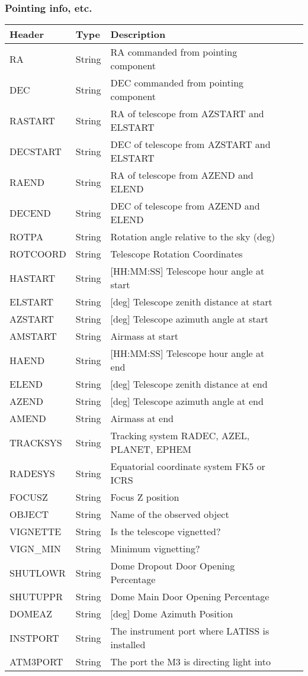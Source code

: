 \subsubsection{Pointing info, etc.}


\begin{tabular}{l l l l l}
\hline
Header & Type & Description \\
\hline
RA & String & RA commanded from pointing component \\
DEC & String & DEC commanded from pointing component \\
RASTART & String & RA of telescope from AZSTART and ELSTART \\
DECSTART & String & DEC of telescope from AZSTART and ELSTART \\
RAEND & String & RA of telescope from AZEND and ELEND \\
DECEND & String & DEC of telescope from AZEND and ELEND \\
ROTPA & String & Rotation angle relative to the sky (deg) \\
ROTCOORD & String & Telescope Rotation Coordinates \\
HASTART & String & [HH:MM:SS] Telescope hour angle at start \\
ELSTART & String & [deg] Telescope zenith distance at start \\
AZSTART & String & [deg] Telescope azimuth angle at start \\
AMSTART & String & Airmass at start \\
HAEND & String & [HH:MM:SS] Telescope hour angle at end \\
ELEND & String & [deg] Telescope zenith distance at end \\
AZEND & String & [deg] Telescope azimuth angle at end \\
AMEND & String & Airmass at end \\
TRACKSYS & String & Tracking system RADEC, AZEL, PLANET, EPHEM \\
RADESYS & String & Equatorial coordinate system FK5 or ICRS \\
FOCUSZ & String & Focus Z position \\
OBJECT & String & Name of the observed object \\
VIGNETTE & String & Is the telescope vignetted? \\
VIGN\_MIN & String & Minimum vignetting? \\
SHUTLOWR & String & Dome Dropout Door Opening Percentage \\
SHUTUPPR & String & Dome Main Door Opening Percentage \\
DOMEAZ & String & [deg] Dome Azimuth Position \\
INSTPORT & String & The instrument port where LATISS is installed \\
ATM3PORT & String & The port the M3 is directing light into \\
\hline
\end{tabular}


